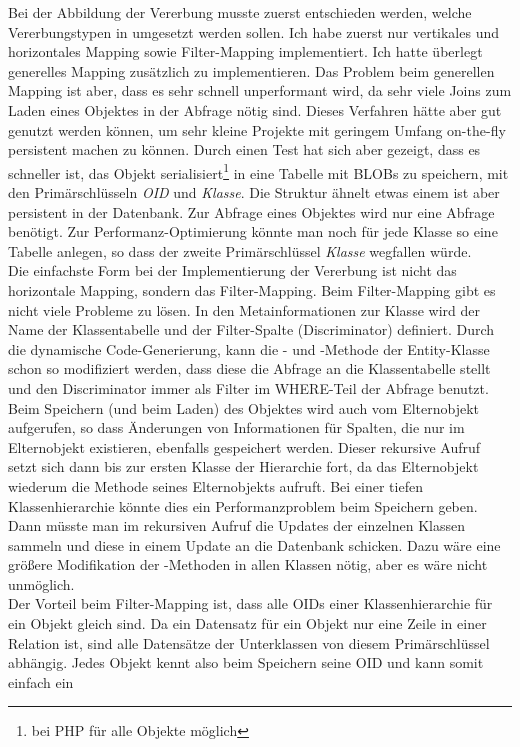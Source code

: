 Bei der Abbildung der Vererbung musste zuerst entschieden werden, welche Vererbungstypen in \PSCORM umgesetzt werden sollen. Ich habe zuerst nur vertikales und horizontales Mapping sowie Filter-Mapping implementiert. Ich hatte überlegt generelles Mapping zusätzlich zu implementieren. Das Problem beim generellen Mapping ist aber, dass es sehr schnell unperformant wird, da sehr viele Joins zum Laden eines Objektes in der Abfrage nötig sind. Dieses Verfahren hätte aber gut genutzt werden können, um sehr kleine Projekte mit geringem Umfang on-the-fly persistent machen zu können. Durch einen Test hat sich aber gezeigt, dass es schneller ist, das Objekt serialisiert\footnote{bei PHP für alle Objekte möglich} in eine Tabelle mit BLOBs zu speichern, mit den Primärschlüsseln \textit{OID} und \textit{Klasse}. Die Struktur ähnelt etwas einem \objectcache ist aber persistent in der Datenbank. Zur Abfrage eines Objektes wird nur eine Abfrage benötigt. Zur Performanz-Optimierung könnte man noch für jede Klasse so eine Tabelle anlegen, so dass der zweite Primärschlüssel \textit{Klasse} wegfallen würde. \\
Die einfachste Form bei der Implementierung der Vererbung ist nicht das horizontale Mapping, sondern das Filter-Mapping. Beim Filter-Mapping gibt es nicht viele Probleme zu lösen. In den Metainformationen zur Klasse wird der Name der Klassentabelle und der Filter-Spalte (Discriminator) definiert. Durch die dynamische Code-Generierung, kann die - und -Methode der Entity-Klasse schon so modifiziert werden, dass diese die Abfrage an die Klassentabelle stellt und den Discriminator immer als Filter im WHERE-Teil der Abfrage benutzt. Beim Speichern (und beim Laden) des Objektes wird auch  vom Elternobjekt aufgerufen, so dass Änderungen von Informationen für Spalten, die nur im Elternobjekt existieren, ebenfalls gespeichert werden. Dieser rekursive Aufruf setzt sich dann bis zur ersten Klasse der Hierarchie fort, da das Elternobjekt wiederum die Methode seines Elternobjekts aufruft. Bei einer tiefen Klassenhierarchie könnte dies ein Performanzproblem beim Speichern geben. Dann müsste man im rekursiven Aufruf die Updates der einzelnen Klassen sammeln und diese in einem Update an die Datenbank schicken. Dazu wäre eine größere Modifikation der -Methoden in allen Klassen nötig, aber es wäre nicht unmöglich.\\
Der Vorteil beim Filter-Mapping ist, dass alle OIDs einer Klassenhierarchie für ein Objekt gleich sind. Da ein Datensatz für ein Objekt nur eine Zeile in einer Relation ist, sind alle Datensätze der Unterklassen von diesem Primärschlüssel abhängig. Jedes Objekt kennt also beim Speichern seine OID und kann somit einfach ein 
